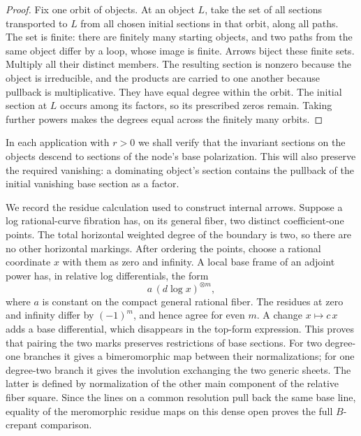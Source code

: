 \begin{proof}
Fix one orbit of objects.  At an object $L$, take the set of all
sections transported to $L$ from all chosen initial sections in that
orbit, along all paths.  The set is finite: there are finitely many
starting objects, and two paths from the same object differ by a
loop, whose image is finite.  Arrows biject these finite sets.
Multiply all their distinct members.  The resulting section is
nonzero because the object is irreducible, and the products are
carried to one another because pullback is multiplicative.  They
have equal degree within the orbit.  The initial section at $L$
occurs among its factors, so its prescribed zeros remain.  Taking
further powers makes the degrees equal across the finitely many
orbits.
\end{proof}

In each application with $r>0$ we shall verify that the invariant
sections on the objects descend to sections of the node's base
polarization.  This will also preserve the required vanishing: a
dominating object's section contains the pullback of the initial
vanishing base section as a factor.

We record the residue calculation used to construct internal arrows.
Suppose a log rational-curve fibration has, on its general fiber,
two distinct coefficient-one points.  The total horizontal weighted
degree of the boundary is two, so there are no other horizontal
markings.  After ordering the points, choose a rational coordinate
$x$ with them as zero and infinity.  A local base frame of an
adjoint power has, in relative log differentials, the form
\begin{equation}
 \label{floor:dlog-residues}
  a\,(d\log x)^{\otimes m},
\end{equation}
where $a$ is constant on the compact general rational fiber.  The
residues at zero and infinity differ by $(-1)^m$, and hence agree
for even $m$.  A change $x\mapsto c\,x$ adds a base differential,
which disappears in the top-form expression.  This proves that
pairing the two marks preserves restrictions of base sections.
For two degree-one branches it gives a bimeromorphic map between
their normalizations; for one degree-two branch it gives the
involution exchanging the two generic sheets.  The latter is
defined by normalization of the other main component of the
relative fiber square.  Since the lines on a common resolution
pull back the same base line, equality of the meromorphic residue
maps on this dense open proves the full $B$-crepant comparison.


